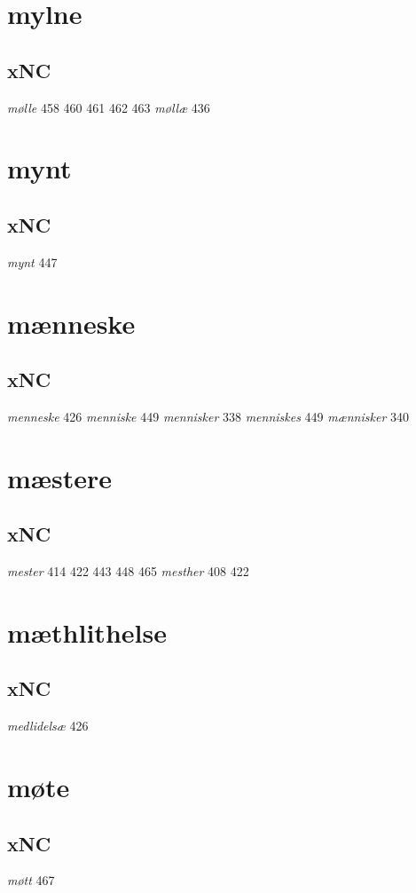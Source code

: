 \documentclass[a4paper,twocolumn]{article}
\begin{document}
\section{mylne}
\label{sec:org3600840}
\subsection{xNC}
\label{sec:org57270a6}
\emph{mølle} 458 460 461 462 463 \emph{møllæ} 436 
\section{mynt}
\label{sec:org9f23615}
\subsection{xNC}
\label{sec:orgaebd54b}
\emph{mynt} 447 
\section{mænneske}
\label{sec:org386370d}
\subsection{xNC}
\label{sec:org0c6f0b2}
\emph{menneske} 426 \emph{menniske} 449 \emph{mennisker} 338 \emph{menniskes} 449 \emph{mænnisker} 340 
\section{mæstere}
\label{sec:org147bbc2}
\subsection{xNC}
\label{sec:org6fb80d8}
\emph{mester} 414 422 443 448 465 \emph{mesther} 408 422 
\section{mæthlithelse}
\label{sec:org5806306}
\subsection{xNC}
\label{sec:org1f62504}
\emph{medlidelsæ} 426 
\section{møte}
\label{sec:orge85ff7c}
\subsection{xNC}
\label{sec:org698febe}
\emph{møtt} 467 
\end{document}
